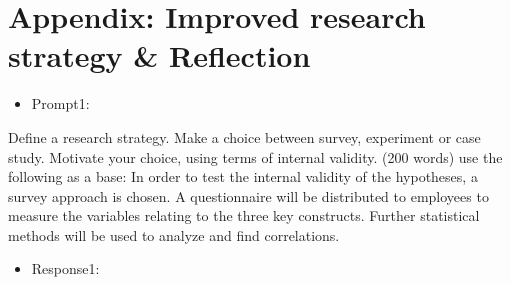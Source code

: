 \documentclass[UTF8,a4paper,AutoFakeBold,AutoFakeSlant]{article}
\begin{document}






\newpage
\appendix
\section{Appendix: Improved research strategy \& Reflection}

\begin{itemize}
    \item Prompt1:
\end{itemize}

Define a research strategy. Make a choice between survey, experiment or case study. Motivate your choice, using terms of internal validity. (200 words) use the following as a base: In order to test the internal validity of the hypotheses, a survey approach is chosen. A questionnaire will be distributed to employees to measure the variables relating to the three key constructs. Further statistical methods will be used to analyze and find correlations.

\begin{itemize}
    \item Response1:
\end{itemize}
\end{document}
